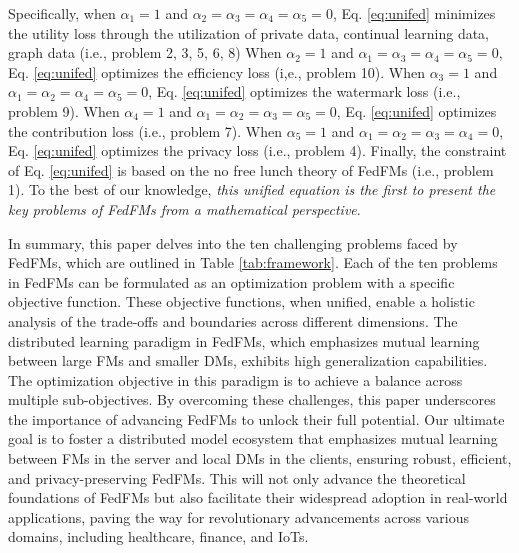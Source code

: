 Specifically, when $\alpha_1 = 1$ and $\alpha_2=\alpha_3=\alpha_4 = \alpha_5= 0$, Eq.  \eqref{eq:unifed} minimizes the utility loss through the utilization of private data, continual learning data, graph data (i.e., problem 2, 3, 5, 6, 8) When $\alpha_2 = 1$ and $\alpha_1=\alpha_3=\alpha_4 = \alpha_5= 0$, Eq.  \eqref{eq:unifed} optimizes the efficiency loss (i,e., problem 10). When $\alpha_3 = 1$ and $\alpha_1=\alpha_2=\alpha_4 = \alpha_5= 0$, Eq.  \eqref{eq:unifed} optimizes the watermark loss (i.e., problem 9). When $\alpha_4 = 1$ and $\alpha_1=\alpha_2=\alpha_3 = \alpha_5= 0$, Eq.  \eqref{eq:unifed} optimizes the contribution loss (i.e., problem 7). When $\alpha_5 = 1$ and $\alpha_1=\alpha_2=\alpha_3 = \alpha_4= 0$, Eq.  \eqref{eq:unifed} optimizes the privacy loss (i.e., problem 4). Finally, the constraint of Eq.  \eqref{eq:unifed} is based on the no free lunch theory of FedFMs (i.e., problem 1). To the best of our knowledge, \textit{this unified equation is the first to present the key problems of FedFMs from a mathematical perspective}.


In summary,  this paper delves into the ten challenging problems faced by FedFMs, which are outlined in Table \ref{tab:framework}. 
Each of the ten problems in FedFMs can be formulated as an optimization problem with a specific objective function. These objective functions, when unified, enable a holistic analysis of the trade-offs and boundaries across different dimensions. The distributed learning paradigm in FedFMs, which emphasizes mutual learning between large FMs and smaller DMs, exhibits high generalization capabilities. The optimization objective in this paradigm is to achieve a balance across multiple sub-objectives.
By overcoming these challenges, this paper underscores the importance of advancing FedFMs to unlock their full potential.
Our ultimate goal is to foster a distributed model ecosystem that emphasizes mutual learning between FMs in the server and local DMs in the clients, ensuring robust, efficient, and privacy-preserving FedFMs.  This will not only advance the theoretical foundations of FedFMs but also facilitate their widespread adoption in real-world applications, paving the way for revolutionary advancements across various domains, including healthcare, finance, and IoTs.






